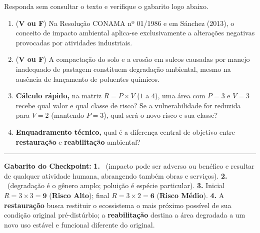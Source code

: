 \begin{boxTeste}
Responda sem consultar o texto e verifique o gabarito logo abaixo.
\begin{enumerate}[leftmargin=1.6em, itemsep=3pt]
  \item (\textbf{V ou F}) Na Resolução CONAMA nº 01/1986 e em Sánchez (2013), o conceito de impacto ambiental aplica-se exclusivamente a alterações negativas provocadas por atividades industriais.
  \item (\textbf{V ou F}) A compactação do solo e a erosão em sulcos causadas por manejo inadequado de pastagem constituem degradação ambiental, mesmo na ausência de lançamento de poluentes químicos.
  \item \textbf{Cálculo rápido,} na matriz $R = P \times V$ ($1$ a $4$), uma área com $P = 3$ e $V = 3$ recebe qual valor e qual classe de risco? Se a vulnerabilidade for reduzida para $V = 2$ (mantendo $P = 3$), qual será o novo risco e sua classe?
  \item \textbf{Enquadramento técnico,} qual é a diferença central de objetivo entre \textbf{restauração} e \textbf{reabilitação} ambiental?
\end{enumerate}
\vspace{3pt}
\hrule
\vspace{4pt}
{\footnotesize\textbf{Gabarito do Checkpoint:}
\textbf{1.} \F\ (impacto pode ser adverso ou benéfico e resultar de qualquer atividade humana, abrangendo também obras e serviços). \quad
\textbf{2.} \V\ (degradação é o gênero amplo; poluição é espécie particular). \quad
\textbf{3.} Inicial $R = 3 \times 3 = \mathbf{9}$ (\textbf{Risco Alto}); final $R = 3 \times 2 = \mathbf{6}$ (\textbf{Risco Médio}). \quad
\textbf{4.} A \textbf{restauração} busca restituir o ecossistema o mais próximo possível de sua condição original pré-distúrbio; a \textbf{reabilitação} destina a área degradada a um novo uso estável e funcional diferente do original.}
\end{boxTeste}
